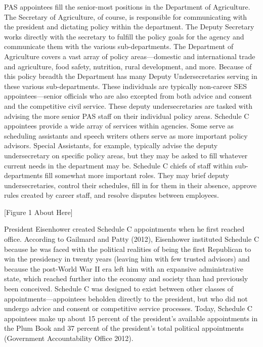 \documentclass[12pt]{article}
\begin{document}
PAS appointees fill the senior-most positions in the Department of Agriculture. The Secretary of Agriculture, of course, is responsible for communicating with the president and dictating policy within the department. The Deputy Secretary works directly with the secretary to fulfill the policy goals for the agency and communicate them with the various sub-departments. The Department of Agriculture covers a vast array of policy areas---domestic and international trade and agriculture, food safety, nutrition, rural development, and more. Because of this policy breadth the Department has many Deputy Undersecretaries serving in these various sub-departments. These individuals are typically non-career SES appointees---senior officials who are also excepted from both advice and consent and the competitive civil service. These deputy undersecretaries are tasked with advising the more senior PAS staff on their individual policy areas. Schedule C appointees provide a wide array of services within agencies. Some serve as scheduling assistants and speech writers others serve as more important policy advisors. Special Assistants, for example, typically advise the deputy undersecretary on specific policy areas, but they may be asked to fill whatever current needs in the department may be. Schedule C chiefs of staff within sub-departments fill somewhat more important roles. They may brief deputy undersecretaries, control their schedules, fill in for them in their absence, approve rules created by career staff, and resolve disputes between employees. 
	
\begin{center}[Figure 1 About Here]	\end{center}

	President Eisenhower created Schedule C appointments when he first reached office. According to Gailmard and Patty (2012), Eisenhower instituted Schedule C because he was faced with the political realities of being the first Republican to win the presidency in twenty years (leaving him with few trusted advisors) and because the post-World War II era left him with an expansive administrative state, which reached further into the economy and society than had previously been conceived. Schedule C was designed to exist between other classes of appointments---appointees beholden directly to the president, but who did not undergo advice and consent or competitive service processes. Today, Schedule C appointees make up about 15 percent of the president's available appointments in the Plum Book and 37 percent of the president's total political appointments (Government Accountability Office 2012).
	
\end{document}
